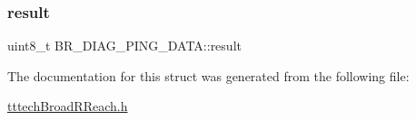 \mbox{\label{struct_b_r___d_i_a_g___p_i_n_g___d_a_t_a_ac31c42bf1a1783d9c6aa3de70a0b29cf}} 
\subsubsection{\texorpdfstring{result}{result}}
{\footnotesize\ttfamily uint8\+\_\+t B\+R\+\_\+\+D\+I\+A\+G\+\_\+\+P\+I\+N\+G\+\_\+\+D\+A\+T\+A\+::result}



The documentation for this struct was generated from the following file\+:\begin{DoxyCompactItemize}
\item 
\mbox{\hyperlink{tttech_broad_r_reach_8h}{tttech\+Broad\+R\+Reach.\+h}}\end{DoxyCompactItemize}
